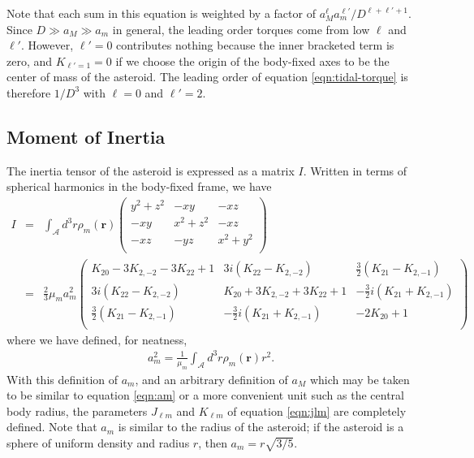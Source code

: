\documentclass{aastex631}
\newcommand{\parens}[1]{\left( #1 \right)}
\begin{document}
Note that each sum in this equation is weighted by a factor of $a_M^\ell a_m^{\ell'}/D^{\ell+\ell'+1}$. Since $D \gg a_M \gg a_m$ in general, the leading order torques come from low $\ell$ and $\ell'$. However, $\ell'=0$ contributes nothing because the inner bracketed term is zero, and $K_{\ell' = 1} = 0$ if we choose the origin of the body-fixed axes to be the center of mass of the asteroid. The leading order of equation \ref{eqn:tidal-torque} is therefore $1/D^3$ with $\ell = 0$ and $\ell' = 2$.


\subsection{Moment of Inertia}
The inertia tensor of the asteroid is expressed as a matrix $I$. Written in terms of spherical harmonics in the body-fixed frame, we have
\begin{eqnarray}
I & = &\int_\mathcal{A} d^3 r\rho_m(\mathbf r) \parens{\begin{array}{ccc}
y^2 + z^2 & -xy & -xz \\
-xy & x^2 + z^2 & -xz \\
-xz & -yz & x^2 + y^2 \\
\end{array}}\\
& = &\frac{2}{3}\mu_m a_m^2\parens{\begin{array}{ccc}
K_{20}-3K_{2,-2}-3K_{22}+1 & 3i \parens{K_{22}-K_{2,-2}} & \frac{3}{2}\parens{K_{21}-K_{2,-1}}\\
3i \parens{K_{22}-K_{2,-2}} & K_{20}+3K_{2,-2}+3K_{22}+1 & -\frac{3}{2}i\parens{K_{21}+K_{2,-1}}\\
\frac{3}{2}\parens{K_{21}-K_{2,-1}} & -\frac{3}{2}i\parens{K_{21}+K_{2,-1}} & -2K_{20}+1\\
\end{array}}
\label{eqn:moi}
\end{eqnarray}
where we have defined, for neatness,
\begin{eqnarray}
a_m^2=\frac{1}{\mu_m}\int_\mathcal{A} d^3 r \rho_m(\mathbf r) r^2.
\label{eqn:am}
\end{eqnarray}
With this definition of $a_m$, and an arbitrary definition of $a_M$ which may be taken to be similar to equation \ref{eqn:am} or a more convenient unit such as the central body radius, the parameters $J_{\ell m}$ and $K_{\ell m}$ of equation \ref{eqn:jlm} are completely defined. Note that $a_m$ is similar to the radius of the asteroid; if the asteroid is a sphere of uniform density and radius $r$, then $a_m = r\sqrt{3/5}$.
\end{document}
